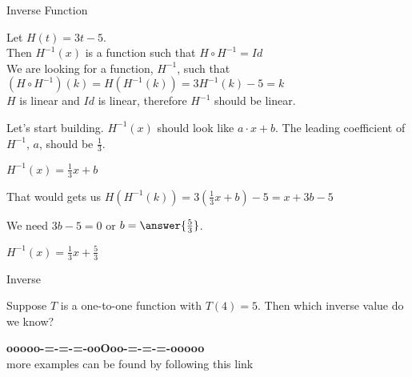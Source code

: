 \documentclass{ximera}
\begin{document}
\begin{example} Inverse Function


Let $H(t) = 3t - 5$. \\

Then $H^{-1}(x)$ is a function such that $H \circ H^{-1} = Id$ \\


We are looking for a function, $H^{-1}$, such that $(H \circ H^{-1})(k) = H(H^{-1}(k)) = 3 H^{-1}(k) - 5 = k$ \\



$H$ is linear and $Id$ is linear, therefore $H^{-1}$ should be linear.

Let's start building.  $H^{-1}(x)$ should look like $a \cdot x + b$.  The leading coefficient of $H^{-1}$, $a$, should be $\frac{1}{3}$.


$H^{-1}(x) =\frac{1}{3} x + b$


That would gets us $H(H^{-1}(k)) = 3 (\frac{1}{3}x + b) - 5 = x + 3b - 5 $


We need $3b - 5 = 0$ or $b = \answer{\frac{5}{3}}$.


$H^{-1}(x) =\frac{1}{3} x + \frac{5}{3}$



\end{example}




\begin{question} Inverse


Suppose $T$ is a one-to-one function with $T(4) = 5$. Then which inverse value do we know?


\begin{multipleChoice}
\end{multipleChoice}

\end{question}






















\begin{center}
\textbf{\textcolor{green!50!black}{ooooo-=-=-=-ooOoo-=-=-=-ooooo}} \\

more examples can be found by following this link\\ 

\end{center}
\end{document}

